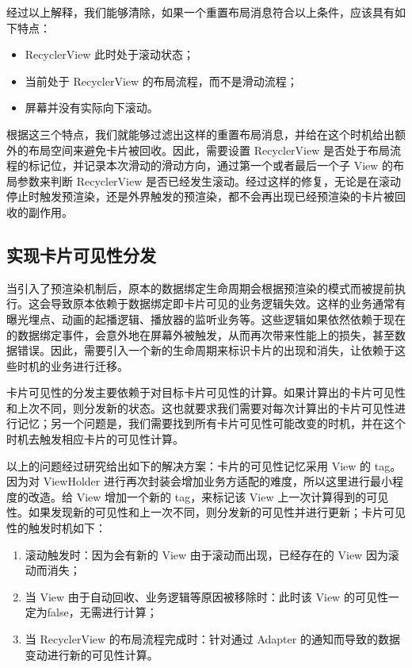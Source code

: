 经过以上解释，我们能够清除，如果一个重置布局消息符合以上条件，应该具有如下特点：

\begin{itemize}
    \item RecyclerView 此时处于滚动状态；
    \item 当前处于 RecyclerView 的布局流程，而不是滑动流程；
    \item 屏幕并没有实际向下滚动。
\end{itemize}

根据这三个特点，我们就能够过滤出这样的重置布局消息，并给在这个时机给出额外的布局空间来避免卡片被回收。因此，需要设置 RecyclerView 是否处于布局流程的标记位，并记录本次滑动的滑动方向，通过第一个或者最后一个子 View 的布局参数来判断 RecyclerView 是否已经发生滚动。经过这样的修复，无论是在滚动停止时触发预渲染，还是外界触发的预渲染，都不会再出现已经预渲染的卡片被回收的副作用。

\subsection{实现卡片可见性分发}

当引入了预渲染机制后，原本的数据绑定生命周期会根据预渲染的模式而被提前执行。这会导致原本依赖于数据绑定即卡片可见的业务逻辑失效。这样的业务通常有曝光埋点、动画的起播逻辑、播放器的监听业务等。这些逻辑如果依然依赖于现在的数据绑定事件，会意外地在屏幕外被触发，从而再次带来性能上的损失，甚至数据错误。因此，需要引入一个新的生命周期来标识卡片的出现和消失，让依赖于这些时机的业务进行迁移。

卡片可见性的分发主要依赖于对目标卡片可见性的计算。如果计算出的卡片可见性和上次不同，则分发新的状态。这也就要求我们需要对每次计算出的卡片可见性进行记忆；另一个问题是，我们需要找到所有卡片可见性可能改变的时机，并在这个时机去触发相应卡片的可见性计算。

以上的问题经过研究给出如下的解决方案：卡片的可见性记忆采用 View 的 tag。因为对 ViewHolder 进行再次封装会增加业务方适配的难度，所以这里进行最小程度的改造。给 View 增加一个新的 tag，来标记该 View 上一次计算得到的可见性。如果发现新的可见性和上一次不同，则分发新的可见性并进行更新；卡片可见性的触发时机如下：

\begin{enumerate}
    \item 滚动触发时：因为会有新的 View 由于滚动而出现，已经存在的 View 因为滚动而消失；
    \item 当 View 由于自动回收、业务逻辑等原因被移除时：此时该 View 的可见性一定为false，无需进行计算；
    \item 当 RecyclerView 的布局流程完成时：针对通过 Adapter 的通知而导致的数据变动进行新的可见性计算。
\end{enumerate}

